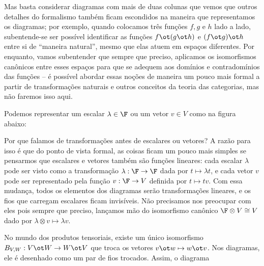 \documentclass[11pt]{article}
\begin{document}
Mas basta considerar diagramas com mais de duas colunas que vemos que outros detalhes do formalismo também ficam escondidos na maneira que representamos os diagramas; por exemplo, quando colocamos três funções \(f,g\) e \(h\) lado a lado, subentende-se ser possível identificar as funções \(f\ot (g\ot h)\) e \((f\ot g)\ot h\) entre si de ``maneira natural'', mesmo que elas atuem em espaços diferentes. Por enquanto, vamos subentender que sempre que preciso, aplicamos os isomorfismos canônicos entre esses espaços para que se adequem aos domínios e contradomínios das funções – é possível abordar essas noções de maneira um pouco mais formal a partir de transformações naturais e outros conceitos da teoria das categorias, mas não faremos isso aqui.

Podemos representar um escalar \(\lambda\in\F\) ou um vetor \(v\in V\) como na figura abaixo:

\begin{latexfigure}
\end{latexfigure}

Por que falamos de transformações antes de escalares ou vetores? A razão para isso é que do ponto de vista formal, as coisas ficam um pouco mais simples se pensarmos que escalares e vetores também são funções lineares: cada escalar \(\lambda\) pode ser visto como a transformação \(\lambda:\F\to\F\) dada por \(t\mapsto\lambda t\), e cada vetor \(v\) pode ser representado pela função \(v:\F\to V\) definida por \(t\mapsto tv\). Com essa mudança, todos os elementos dos diagramas serão transformações lineares, e os fios que carregam escalares ficam invisíveis. Não precisamos nos preocupar com eles pois sempre que preciso, lançamos mão do isomorfismo canônico \(\F\otimes V\cong V\) dado por \(\lambda\otimes v\mapsto\lambda v\).

No mundo dos produtos tensoriais, existe um único isomorfismo \(B_{V,W}:V\ot W\to W\ot V\) que troca os vetores \(v\ot w\mapsto w\ot v\). Nos diagramas, ele é desenhado como um par  de fios trocados. Assim, o diagrama
\end{document}
